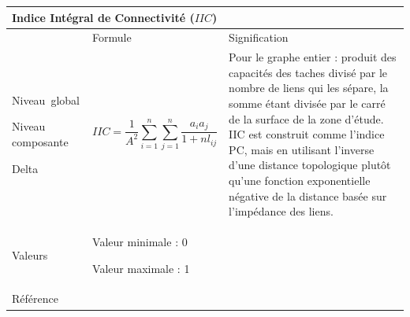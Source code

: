 \documentclass{article}
\begin{document}
\begin{table}[H]
\begin{tabular}{|m{3.24cm}|m{4.4810004cm}m{7.924cm}|}

\hline
\multicolumn{3}{|m{16.044998cm}|}{Indice Intégral de Connectivité ($IIC$)}\\\hline
 &
\multicolumn{1}{m{4.4810004cm}|}{Formule} &
Signification\\\hline
Niveau~global

Niveau composante

Delta &
\multicolumn{1}{m{4.4810004cm}|}{\begin{equation*}
\mathit{IIC}=\frac{1}{{A}^{2}}\sum _{i=1}^{n}{\sum _{j=1}^{n}{{\frac{{a}_{i}{a}_{j}}{{1+\mathit{nl}}_{\mathit{ij}}}}}}
\end{equation*}
} &
Pour le graphe entier : produit des capacités des taches divisé par le nombre de liens qui les sépare, la somme étant divisée par le carré de la surface de la zone d’étude. IIC est construit comme l’indice PC, mais en utilisant l’inverse d’une distance topologique plutôt qu’une fonction exponentielle négative de la distance basée sur l’impédance des liens.

\\\hline
Valeurs &
\multicolumn{2}{m{12.6050005cm}|}{Valeur minimale : 0

Valeur maximale : 1

}\\\hline
Référence &
\multicolumn{2}{m{12.6050005cm}|}{\cite{Pascual2006}}\\\hline
\end{tabular}
\end{table}
\end{document}
